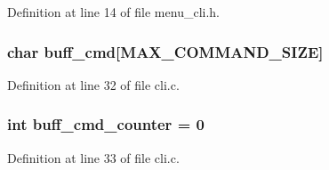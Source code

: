 Definition at line 14 of file menu\_\-cli.h.

\hypertarget{group__CLI_gae9fba632af0bc2e0d51efda2768bbc98}{
\subsubsection[{buff\_\-cmd}]{\setlength{\rightskip}{0pt plus 5cm}char {\bf buff\_\-cmd}\mbox{[}MAX\_\-COMMAND\_\-SIZE\mbox{]}}}
\label{group__CLI_gae9fba632af0bc2e0d51efda2768bbc98}


Definition at line 32 of file cli.c.

\hypertarget{group__CLI_ga559568f2d8d01bc809c6b12c2f214a5f}{
\subsubsection[{buff\_\-cmd\_\-counter}]{\setlength{\rightskip}{0pt plus 5cm}int {\bf buff\_\-cmd\_\-counter} = 0}}
\label{group__CLI_ga559568f2d8d01bc809c6b12c2f214a5f}


Definition at line 33 of file cli.c.

